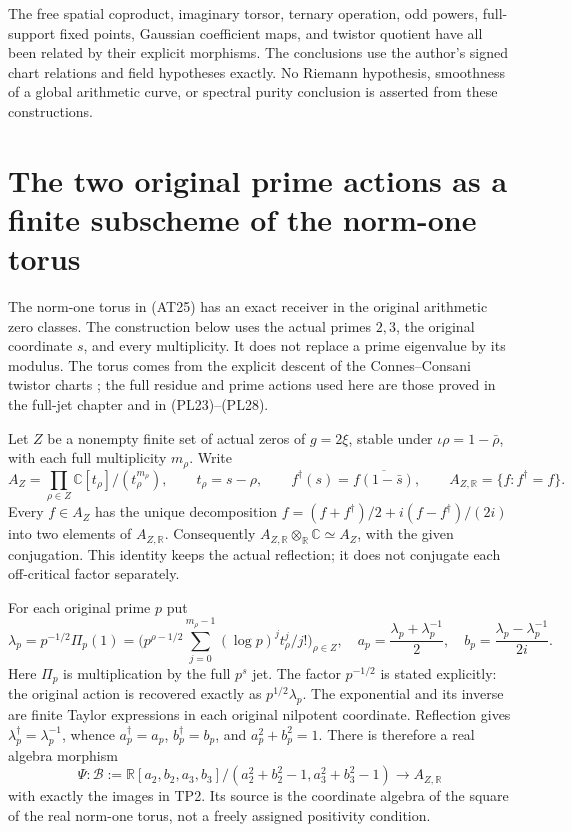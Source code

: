 \documentclass[11pt,a4paper]{article}
\theoremstyle{definition}\newtheorem{definition}[theorem]{Definition}
\newcommand{\C}{\mathbb C}\newcommand{\R}{\mathbb R}
\begin{document}
The free spatial coproduct, imaginary torsor, ternary operation,
odd powers, full-support fixed points, Gaussian coefficient maps,
and twistor quotient have all been related by their explicit
morphisms. The conclusions use the author's signed chart relations
and field hypotheses exactly. No Riemann hypothesis, smoothness
of a global arithmetic curve, or spectral purity conclusion is
asserted from these constructions.


\section{The two original prime actions as a finite subscheme of the norm-one torus}
\label{sec:two-prime-torus}

The norm-one torus in (AT25) has an exact receiver in the original
arithmetic zero classes. The construction below uses the actual primes
$2,3$, the original coordinate $s$, and every multiplicity. It does not
replace a prime eigenvalue by its modulus. The torus comes from the
explicit descent of the Connes--Consani twistor charts
\cite{ConnesConsaniTwistor}; the full residue and prime actions used here
are those proved in the full-jet chapter and in (PL23)--(PL28).

Let $Z$ be a nonempty finite set of actual zeros of $g=2\xi$, stable
under $\iota\rho=1-\bar\rho$, with each full multiplicity $m_\rho$.
Write
\[
 A_Z=\prod_{\rho\in Z}\C[t_\rho]/(t_\rho^{m_\rho}),
 \qquad t_\rho=s-\rho,
 \qquad f^\dagger(s)=\overline{f(1-\bar s)},
 \qquad A_{Z,\R}=\{f:f^\dagger=f\}.
 \tag{TP1}\label{tp:algebra}
\]
Every $f\in A_Z$ has the unique decomposition
$f=(f+f^\dagger)/2+i(f-f^\dagger)/(2i)$ into two elements of
$A_{Z,\R}$. Consequently $A_{Z,\R}\otimes_\R\C\simeq A_Z$,
with the given conjugation. This identity keeps the actual reflection;
it does not conjugate each off-critical factor separately.

For each original prime $p$ put
\[
 \lambda_p=p^{-1/2}\Pi_p(1)
 =\bigl(p^{\rho-1/2}\sum_{j=0}^{m_\rho-1}
       (\log p)^jt_\rho^j/j!\bigr)_{\rho\in Z},
 \quad
 a_p=\frac{\lambda_p+\lambda_p^{-1}}2,
 \quad b_p=\frac{\lambda_p-\lambda_p^{-1}}{2i}.
 \tag{TP2}\label{tp:coordinates}
\]
Here $\Pi_p$ is multiplication by the full $p^s$ jet. The factor
$p^{-1/2}$ is stated explicitly: the original action is recovered
exactly as $p^{1/2}\lambda_p$. The exponential and its inverse are
finite Taylor expressions in each original nilpotent coordinate.
Reflection gives $\lambda_p^\dagger=\lambda_p^{-1}$, whence
$a_p^\dagger=a_p$, $b_p^\dagger=b_p$, and $a_p^2+b_p^2=1$.
There is therefore a real algebra morphism
\[
 \Psi:\mathcal B:=
 \R[a_2,b_2,a_3,b_3]/(a_2^2+b_2^2-1,a_3^2+b_3^2-1)
 \longrightarrow A_{Z,\R}
 \tag{TP3}\label{tp:map}
\]
with exactly the images in TP2. Its source is the coordinate algebra
of the square of the real norm-one torus, not a freely assigned
positivity condition.
\end{document}
